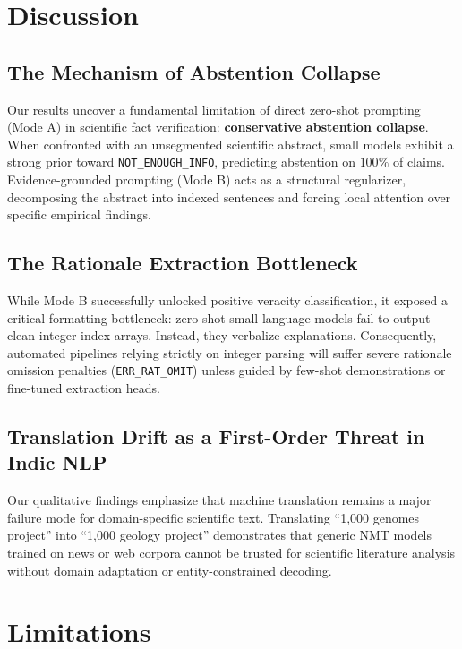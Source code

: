 \documentclass[10pt,twocolumn]{article}
\begin{document}
\section{Discussion}
\label{sec:discussion}

\subsection{The Mechanism of Abstention Collapse}
Our results uncover a fundamental limitation of direct zero-shot prompting (Mode A) in scientific fact verification: \textbf{conservative abstention collapse}. When confronted with an unsegmented scientific abstract, small models exhibit a strong prior toward \texttt{NOT\_ENOUGH\_INFO}, predicting abstention on $100\%$ of claims. Evidence-grounded prompting (Mode B) acts as a structural regularizer, decomposing the abstract into indexed sentences and forcing local attention over specific empirical findings.

\subsection{The Rationale Extraction Bottleneck}
While Mode B successfully unlocked positive veracity classification, it exposed a critical formatting bottleneck: zero-shot small language models fail to output clean integer index arrays. Instead, they verbalize explanations. Consequently, automated pipelines relying strictly on integer parsing will suffer severe rationale omission penalties (\texttt{ERR\_RAT\_OMIT}) unless guided by few-shot demonstrations or fine-tuned extraction heads.

\subsection{Translation Drift as a First-Order Threat in Indic NLP}
Our qualitative findings emphasize that machine translation remains a major failure mode for domain-specific scientific text. Translating ``1,000 genomes project'' into ``1,000 geology project'' demonstrates that generic NMT models trained on news or web corpora cannot be trusted for scientific literature analysis without domain adaptation or entity-constrained decoding.

\section{Limitations}
\label{sec:limitations}
\end{document}
